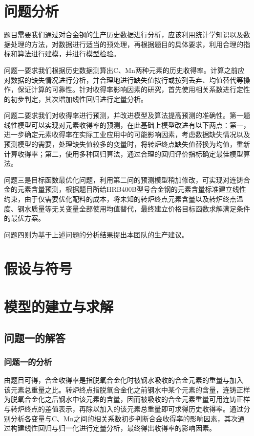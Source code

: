 \documentclass{xcumcmart}
\begin{document}
\section{问题分析}
\par 题目需要我们通过对合金钢的生产历史数据进行分析，应该利用统计学知识以及数据处理的方法，对数据进行适当的预处理，再根据题目的具体要求，利用合理的指标和算法进行建模，并进行模型检验。
\par 问题一要求我们根据历史数据测算出C、Mn两种元素的历史收得率。计算之前应对数据的缺失情况进行分析，并合理地进行缺失值按行或按列丢弃、均值替代等操作，保证计算的可靠性。针对收得率影响因素的研究，首先使用相关系数进行定性的初步判定，其次增加线性回归进行定量分析。
\par 问题二要求我们对收得率进行预测，并改进模型及算法提高预测的准确性。第一题线性模型可以实现对元素收得率的预测，在此基础上模型改进有以下两点：第一，进一步确定元素收得率在实际工业应用中的可能影响因素，考虑数据缺失情况以及预测模型的需要，处理缺失值较多的变量时，将转炉终点缺失值替换为均值，重新计算收得率；第二，使用多种回归算法，通过合理的回归评价指标确定最佳模型算法。
\par 问题三是目标函数最优化问题，利用第二问的预测模型稍加修改，可实现对连铸合金的元素含量预测，根据题目所给HRB400B型号合金钢的元素含量标准建立线性约束，由于仅需要优化配料的成本，将未知的转炉终点元素含量以及转炉终点温度、钢水质量等无关变量全部使用均值替代，最终建立价格目标函数求解满足条件的最优方案。
\par 问题四则为基于上述问题的分析结果提出本团队的生产建议。

\section{假设与符号}

\section{模型的建立与求解}
\subsection{问题一的解答}
\subsubsection{问题一的分析}
\par 由题目可得，合金收得率是指脱氧合金化时被钢水吸收的合金元素的重量与加入 该元素总重量之比。转炉终点指脱氧合金化之前钢水中某个元素的含量，连铸正样为脱氧合金化之后钢水中该元素的含量，因而被吸收的合金元素重量可用连铸正样与转炉终点的差值表示，再除以加入的该元素总重量即可求得历史收得率。通过分别分析各变量与C、Mn之间的相关系数初步判断合金收得率的影响因素，其次通过构建线性回归与归一化进行定量分析，最终得出收得率的影响因素。
\end{document}
